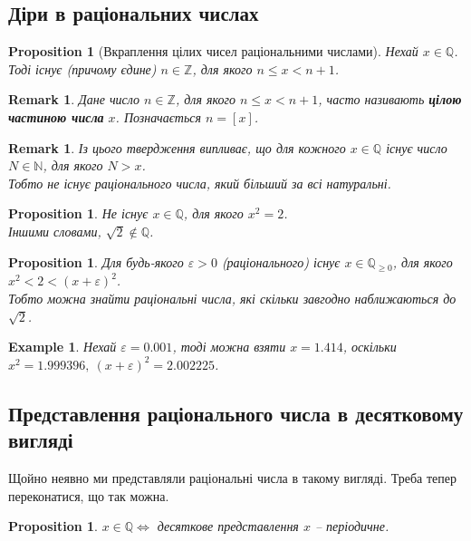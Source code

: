 \documentclass[a4paper, 14pt]{extarticle}
\theoremstyle{theoremdd}
\theoremstyle{theoremdd}
\theoremstyle{theoremdd}
\theoremstyle{theoremdd}
\theoremstyle{theoremdd}
\theoremstyle{theoremdd}
\newtheorem{example}[theorem]{Example}
\theoremstyle{theoremdd}
\theoremstyle{theoremdd}
\theoremstyle{theoremdd}
\theoremstyle{theoremdd}
\newtheorem{proposition}[theorem]{Proposition}
\theoremstyle{theoremdd}
\theoremstyle{theoremdd}
\newtheorem{remark}[theorem]{Remark}
\theoremstyle{theoremdd}
\theoremstyle{theoremdd}
\theoremstyle{theoremdd}
\theoremstyle{theoremdd}
\begin{document}
\subsection{Діри в раціональних числах}
\begin{proposition}[Вкраплення цілих чисел раціональними числами]
Нехай $x \in \mathbb{Q}$. Тоді існує (причому єдине) $n \in \mathbb{Z}$, для якого $n \leq x < n+1$.
\end{proposition}

\begin{remark}
Дане число $n \in \mathbb{Z}$, для якого $n \leq x < n+1$, часто називають \textbf{цілою частиною числа} $x$. Позначається $n = [x]$.
\end{remark}

\begin{remark}
Із цього твердження випливає, що для кожного $x \in \mathbb{Q}$ існує число $N \in \mathbb{N}$, для якого $N > x$.\\
Тобто не існує раціонального числа, який більший за всі натуральні. 
\end{remark}

\begin{proposition}
Не існує $x \in \mathbb{Q}$, для якого $x^2 = 2$.\\
Іншими словами, $\sqrt{2} \notin \mathbb{Q}$.
\end{proposition}

\begin{proposition}
Для будь-якого $\varepsilon > 0$ (раціонального) існує $x \in \mathbb{Q}_{\geq 0}$, для якого $x^2 < 2 < (x+\varepsilon)^2$.\\
Тобто можна знайти раціональні числа, які скільки завгодно наближаються до $\sqrt{2}$.
\end{proposition}

\begin{example}
Нехай $\varepsilon = 0.001$, тоді можна взяти $x = 1.414$, оскільки $x^2 = 1.999396,\ (x+\varepsilon)^2 = 2.002225$.
\end{example}

\subsection{Представлення раціонального числа в десятковому вигляді}
Щойно неявно ми представляли раціональні числа в такому вигляді. Треба тепер переконатися, що так можна.

\begin{proposition}
$x \in \mathbb{Q} \iff$ десяткове представлення $x$ -- періодичне. 
\end{proposition}
\end{document}
